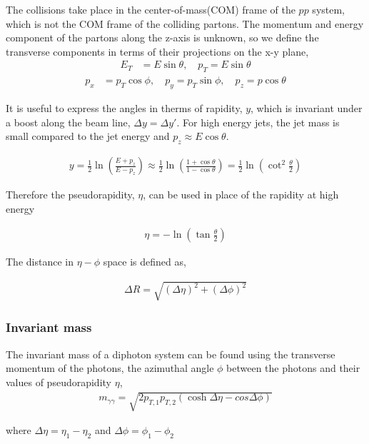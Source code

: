 \documentclass[10pt, aps, twocolumn, a4paper, nofootinbib]{revtex4}
\begin{document}
The collisions take place in the center-of-mass(COM) frame of the $pp$ system, which is not the COM frame of the colliding partons. The momentum and energy component of the partons along the z-axis is unknown, so we define the transverse components in terms of their projections on the x-y plane, 
\begin{align}
E_T &= E\sin\theta,  \quad p_T = E\sin\theta \label{eq:etpt}
\end{align} 
\begin{align}
p_x &= p_T\cos\phi, \quad p_y = p_T\sin\phi, \quad p_z = p\cos\theta \label{eq: pxpypz}
\end{align}

It is useful to express the angles in therms of rapidity, $y$, which is invariant under a boost along the beam line, $\Delta y = \Delta y'$. For high energy jets, the jet mass is small compared to the jet energy and $p_z \approx E\cos\theta$. 

\begin{align}
y = \frac{1}{2}\ln\left(\frac{E+p_z}{E-p_z}\right)\approx\frac{1}{2}\ln\left(\frac{1+\cos\theta}{1-\cos\theta}\right) = \frac{1}{2}\ln\left(\cot^2 \frac{\theta}{2}\right)
\end{align}

Therefore the pseudorapidity, $\eta$, can be used in place of the rapidity at high energy

\begin{align}
\eta = -\ln\left(\tan\frac{\theta}{2}\right) \label{eq:pseudorapidity}
\end{align}

The distance in $\eta-\phi$ space is defined as,

\begin{align}
\Delta R = \sqrt{(\Delta\eta)^2 + (\Delta\phi)^2} \label{eq:delta_R}
\end{align}

\subsubsection{Invariant mass}
The invariant mass of a diphoton system can be found using the transverse momentum of the photons, the azimuthal angle $\phi$ between the photons and their values of pseudorapidity $\eta$, 
\begin{align}
m_{\gamma\gamma} = \sqrt{2p_{T,1}p_{T,2}(\cosh\Delta\eta - cos\Delta\phi)} \label{eq:invariant_mass}
\end{align}

where $\Delta\eta = \eta_1 - \eta_2$ and $\Delta\phi = \phi_1 - \phi_2$
\end{document}
